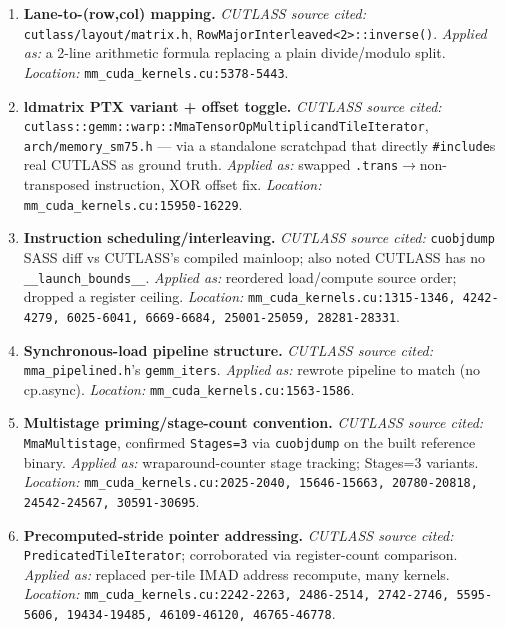 \documentclass[11pt]{article}
\begin{document}
\begin{enumerate}[leftmargin=*]

\item \textbf{Lane-to-(row,col) mapping.}
\textit{CUTLASS source cited:} \texttt{cutlass/layout/matrix.h},
\texttt{RowMajorInterleaved<2>::inverse()}.
\textit{Applied as:} a 2-line arithmetic formula replacing a plain
divide/modulo split.
\textit{Location:} \texttt{mm\_cuda\_kernels.cu:5378-5443}.

\item \textbf{ldmatrix PTX variant + offset toggle.}
\textit{CUTLASS source cited:}
\texttt{cutlass::gemm::warp::MmaTensorOpMultiplicandTileIterator},
\texttt{arch/memory\_sm75.h} --- via a standalone scratchpad that directly
\texttt{\#include}s real CUTLASS as ground truth.
\textit{Applied as:} swapped \texttt{.trans}$\to$non-transposed instruction,
XOR offset fix.
\textit{Location:} \texttt{mm\_cuda\_kernels.cu:15950-16229}.

\item \textbf{Instruction scheduling/interleaving.}
\textit{CUTLASS source cited:} \texttt{cuobjdump} SASS diff vs CUTLASS's
compiled mainloop; also noted CUTLASS has no \texttt{\_\_launch\_bounds\_\_}.
\textit{Applied as:} reordered load/compute source order; dropped a
register ceiling.
\textit{Location:} \texttt{mm\_cuda\_kernels.cu:1315-1346, 4242-4279,
6025-6041, 6669-6684, 25001-25059, 28281-28331}.

\item \textbf{Synchronous-load pipeline structure.}
\textit{CUTLASS source cited:} \texttt{mma\_pipelined.h}'s
\texttt{gemm\_iters}.
\textit{Applied as:} rewrote pipeline to match (no cp.async).
\textit{Location:} \texttt{mm\_cuda\_kernels.cu:1563-1586}.

\item \textbf{Multistage priming/stage-count convention.}
\textit{CUTLASS source cited:} \texttt{MmaMultistage}, confirmed
\texttt{Stages=3} via \texttt{cuobjdump} on the built reference binary.
\textit{Applied as:} wraparound-counter stage tracking; Stages=3 variants.
\textit{Location:} \texttt{mm\_cuda\_kernels.cu:2025-2040, 15646-15663,
20780-20818, 24542-24567, 30591-30695}.

\item \textbf{Precomputed-stride pointer addressing.}
\textit{CUTLASS source cited:} \texttt{PredicatedTileIterator};
corroborated via register-count comparison.
\textit{Applied as:} replaced per-tile IMAD address recompute, many
kernels.
\textit{Location:} \texttt{mm\_cuda\_kernels.cu:2242-2263, 2486-2514,
2742-2746, 5595-5606, 19434-19485, 46109-46120, 46765-46778}.


\end{enumerate}
\end{document}
